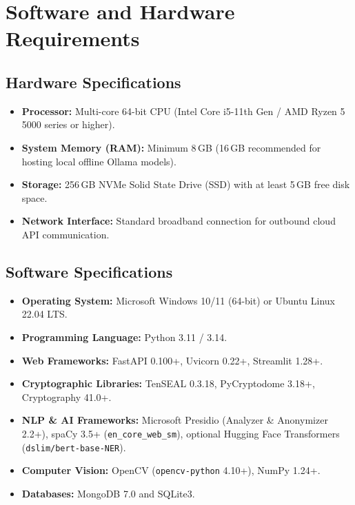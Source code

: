 \documentclass[12pt,a4paper,oneside]{report}
\numberwithin{equation}{chapter}
\begin{document}
\section{Software and Hardware Requirements}

\subsection{Hardware Specifications}
\begin{itemize}[leftmargin=*]
    \item \textbf{Processor:} Multi-core 64-bit CPU (Intel Core i5-11th Gen / AMD Ryzen 5 5000 series or higher).
    \item \textbf{System Memory (RAM):} Minimum 8\,GB (16\,GB recommended for hosting local offline Ollama models).
    \item \textbf{Storage:} 256\,GB NVMe Solid State Drive (SSD) with at least 5\,GB free disk space.
    \item \textbf{Network Interface:} Standard broadband connection for outbound cloud API communication.
\end{itemize}

\subsection{Software Specifications}
\begin{itemize}[leftmargin=*]
    \item \textbf{Operating System:} Microsoft Windows 10/11 (64-bit) or Ubuntu Linux 22.04 LTS.
    \item \textbf{Programming Language:} Python 3.11 / 3.14.
    \item \textbf{Web Frameworks:} FastAPI 0.100+, Uvicorn 0.22+, Streamlit 1.28+.
    \item \textbf{Cryptographic Libraries:} TenSEAL 0.3.18, PyCryptodome 3.18+, Cryptography 41.0+.
    \item \textbf{NLP \& AI Frameworks:} Microsoft Presidio (Analyzer \& Anonymizer 2.2+), spaCy 3.5+ (\texttt{en\_core\_web\_sm}), optional Hugging Face Transformers (\texttt{dslim/bert-base-NER}).
    \item \textbf{Computer Vision:} OpenCV (\texttt{opencv-python} 4.10+), NumPy 1.24+.
    \item \textbf{Databases:} MongoDB 7.0 and SQLite3.
\end{itemize}
\end{document}
